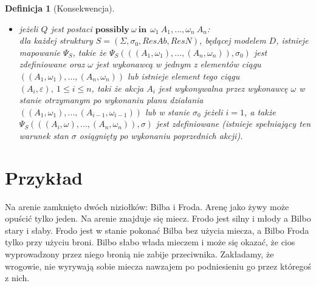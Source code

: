\documentclass[11pt,a4paper]{article}
\newtheorem{definition}{Definicja}[section]
\begin{document}
\begin{definition}[Konsekwencja]
\begin{itemize}
    	 \item jeżeli $Q$ jest postaci $\mathbf{possibly}~\omega~\mathbf{in}~~\omega_1~A_1, ..., \omega_n~A_n$: \\
    	 dla każdej struktury $S=(\Sigma, \sigma_0, ResAb, ResN)$, będącej modelem $D$, istnieje mapowanie $\Psi_S$, takie że $\Psi_S(((A_1, \omega_1), ..., (A_n, \omega_n)), \sigma_0)$ jest zdefiniowane oraz $\omega$ jest wykonawcą w jednym z elementów ciągu $((A_1, \omega_1),...,(A_n,\omega_n))$ lub istnieje element tego ciągu $(A_i, \varepsilon),~1 \leq i \leq n$, taki że akcja $A_i$ jest wykonywalna przez wykonawcę $\omega$ w stanie otrzymanym po wykonaniu planu działania $((A_1, \omega_1),...,(A_{i-1},\omega_{i-1}))$ lub w stanie $\sigma_0$ jeżeli $i=1$, a także $\Psi_S(((A_i, \omega), ..., (A_n, \omega_n)), \sigma)$ jest zdefiniowane (istnieje spełniający ten warunek stan $\sigma$ osiągnięty po wykonaniu poprzednich akcji).
    \end{itemize}
    \end{definition}
    
    \section{Przykład}
    
    Na arenie zamknięto dwóch niziołków: Bilba i Froda. Arenę jako żywy może opuścić tylko jeden. Na arenie znajduje się miecz. Frodo jest silny i młody a Bilbo stary i słaby. Frodo jest w stanie pokonać Bilba bez użycia miecza, a Bilbo Froda tylko przy użyciu broni. Bilbo słabo włada mieczem i może się okazać, że cios wyprowadzony przez niego bronią nie zabije przeciwnika. Zakładamy, że wrogowie, nie wyrywają sobie miecza nawzajem po podniesieniu go przez któregoś z nich.
    
\end{document}
